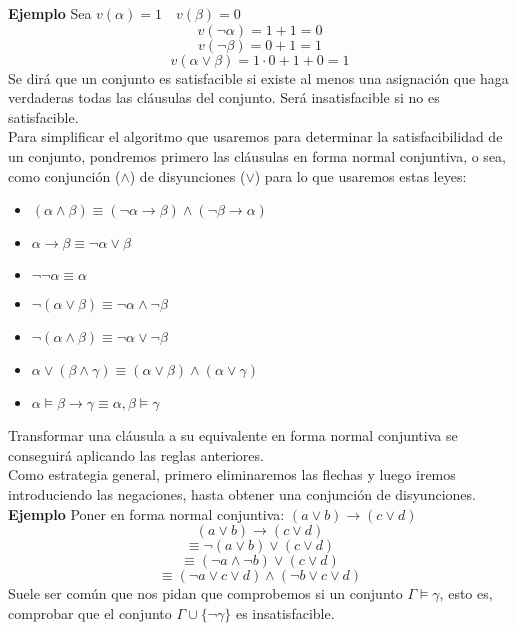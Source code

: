 \documentclass[a4paper]{article}
\begin{document}
\large{\textbf{Ejemplo}}
Sea $v(\alpha)=1 \quad v(\beta)=0$
$$v(\neg\alpha)=1+1=0$$
$$v(\neg\beta)=0+1=1$$
$$v(\alpha\lor\beta)=1\cdot 0 +1+0=1$$
Se dirá que un conjunto es satisfacible si existe al menos una asignación que haga verdaderas todas las cláusulas del conjunto. Será insatisfacible si no es satisfacible.\\
Para simplificar el algoritmo que usaremos para determinar la satisfacibilidad de un conjunto, pondremos primero las cláusulas en forma normal conjuntiva, o sea, como conjunción ($\land$) de disyunciones ($\lor$) para lo que usaremos estas leyes:
\begin{itemize}
\item $(\alpha\land\beta)\equiv(\neg\alpha\rightarrow\beta)\land(\neg\beta\rightarrow\alpha)$
\item $\alpha\rightarrow\beta\equiv\neg\alpha\lor\beta$
\item $\neg\neg\alpha\equiv\alpha$
\item $\neg(\alpha\lor\beta)\equiv\neg\alpha\land\neg\beta$
\item $\neg(\alpha\land\beta)\equiv\neg\alpha\lor\neg\beta$
\item $\alpha\lor(\beta\land\gamma)\equiv(\alpha\lor\beta)\land(\alpha\lor\gamma)$
\item $\alpha\models\beta\rightarrow\gamma\equiv\alpha,\beta\models\gamma$
\end{itemize}
Transformar una cláusula a su equivalente en forma normal conjuntiva se conseguirá aplicando las reglas anteriores.\\
Como estrategia general, primero eliminaremos las flechas y luego iremos introduciendo las negaciones, hasta obtener una conjunción de disyunciones.\\

\large{\textbf{Ejemplo}}
Poner en forma normal conjuntiva: $(a\lor b)\rightarrow(c\lor d)$
$$(a\lor b)\rightarrow(c\lor d)$$
$$\equiv\neg(a\lor b)\lor (c\lor d)$$
$$\equiv (\neg a \land \neg b)\lor(c \lor d)$$
$$\equiv (\neg a\lor c\lor d) \land (\neg b\lor c \lor d)$$
Suele ser común que nos pidan que comprobemos si un conjunto $\Gamma\models\gamma$, esto es, comprobar que el conjunto $\Gamma\cup\lbrace\neg\gamma\rbrace$ es insatisfacible.
\end{document}
